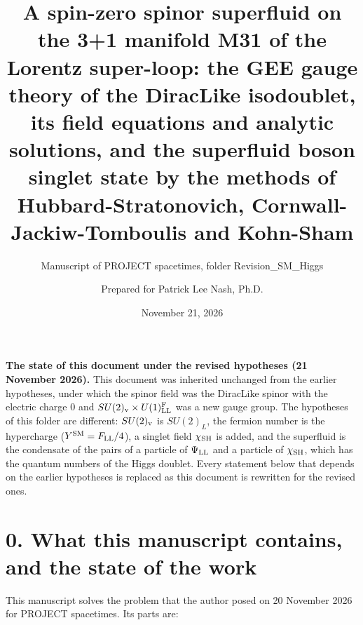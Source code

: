 \documentclass[
  10pt,
]{article}
\title{A spin-zero spinor superfluid on the 3+1 manifold M31 of the
Lorentz super-loop: the GEE gauge theory of the DiracLike isodoublet,
its field equations and analytic solutions, and the superfluid boson
singlet state by the methods of Hubbard-Stratonovich,
Cornwall-Jackiw-Tomboulis and Kohn-Sham}
\subtitle{Manuscript of PROJECT spacetimes, folder Revision\_SM\_Higgs}
\author{Prepared for Patrick Lee Nash, Ph.D.}
\date{November 21, 2026}
\begin{document}
\maketitle

\textbf{The state of this document under the revised hypotheses (21
November 2026).} This document was inherited unchanged from the earlier
hypotheses, under which the spinor field was the DiracLike spinor with
the electric charge 0 and \(SU(2)_{\rm v}\times U(1)^{\rm F}_{\rm LL}\)
was a new gauge group. The hypotheses of this folder are different:
\(SU(2)_{\rm v}\) is \(SU(2)_L\), the fermion number is the hypercharge
(\(Y^{\rm SM}=F_{\rm LL}/4\)), a singlet field \(\chi_{\rm SH}\) is
added, and the superfluid is the condensate of the pairs of a particle
of \(\Psi_{\rm LL}\) and a particle of \(\chi_{\rm SH}\), which has the
quantum numbers of the Higgs doublet. Every statement below that depends
on the earlier hypotheses is replaced as this document is rewritten for
the revised ones.

\hypertarget{what-this-manuscript-contains-and-the-state-of-the-work}{%
\section{0. What this manuscript contains, and the state of the
work}\label{what-this-manuscript-contains-and-the-state-of-the-work}}

This manuscript solves the problem that the author posed on 20 November
2026 for PROJECT spacetimes. Its parts are:
\end{document}

